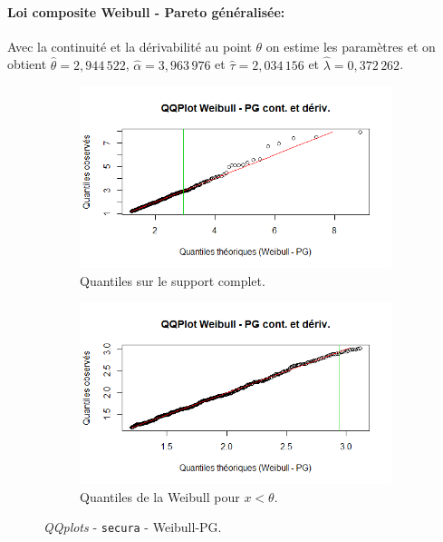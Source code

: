 		\paragraph{Loi composite Weibull - Pareto généralisée:} Avec la continuité et la dérivabilité au point $\theta$ on estime les paramètres et on obtient $\hat{\theta} = 2,944\,522 $, $\hat{\alpha} =  3,963\,976 $ et $\hat{\tau}=2,034\,156 $ et $\hat{\lambda}=0,372\,262$.
	
		\begin{figure}[H]
			\begin{center}
				\begin{subfigure}[b]{0.45\textwidth}
					\includegraphics[scale=0.55]{Graphiques/QQ_Wei_PG_contderiv_secura} 
					\caption{Quantiles sur le support complet.} \label{QQplot_W_PG_conde_secura}
				\end{subfigure}
				\begin{subfigure}[b]{0.4\textwidth}
					\includegraphics[scale=0.55]{Graphiques/QQ_Wei_PG_contderiv_t1_secura} 
					\caption{Quantiles de la Weibull pour $x < \theta$.} \label{QQplot_W_PG_conde_2_secura}
				\end{subfigure}
				\renewcommand{\figurename}{Illustration}
				\caption{\textit{QQplots} - \texttt{secura} - Weibull-PG.}
			\end{center}
		\end{figure}
		
